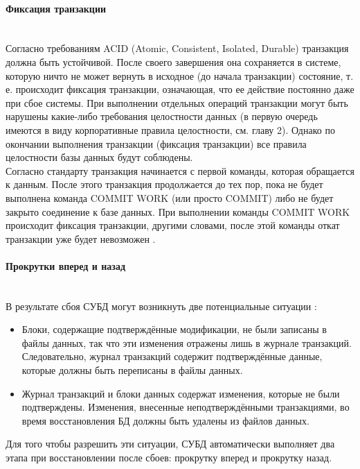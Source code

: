 \paragraph{Фиксация транзакции} ~\\

Согласно требованиям ACID (Atomic, Consistent, Isolated, Durable) транзакция должна быть устойчивой. После своего завершения она сохраняется в системе, которую ничто не может вернуть в исходное (до начала транзакции) состояние, т. е. происходит фиксация транзакции, означающая, что ее действие постоянно даже при сбое системы. При выполнении отдельных операций транзакции могут быть нарушены какие-либо требования целостности данных (в первую очередь имеются в виду корпоративные правила целостности, см. главу 2). Однако по окончании выполнения транзакции (фиксация транзакции) все правила целостности базы данных будут соблюдены. \\


Согласно стандарту транзакция начинается с первой команды, которая обращается к данным. После этого транзакция продолжается до тех пор, пока не будет выполнена команда COMMIT WORK (или просто COMMIT) либо не будет закрыто соединение к базе данных. При выполнении команды COMMIT WORK происходит фиксация транзакции, другими словами, после этой команды откат транзакции уже будет невозможен \autocite{Pirogov2009}.


\paragraph{Прокрутки вперед и назад} ~\\

В результате сбоя СУБД могут возникнуть две потенциальные ситуации \autocite{Karpova2009}:

\begin{itemize}
    \item Блоки, содержащие подтверждённые модификации, не были записаны в файлы данных, так что эти изменения отражены лишь в журнале транзакций. Следовательно, журнал транзакций содержит подтверждённые данные, которые должны быть переписаны в файлы данных.
    \item Журнал транзакций и блоки данных содержат изменения, которые не были подтверждены. Изменения, внесенные неподтверждёнными транзакциями, во время восстановления БД должны быть удалены из файлов данных.
\end{itemize}

Для того чтобы разрешить эти ситуации, СУБД автоматически выполняет два этапа при восстановлении после сбоев: прокрутку вперед и прокрутку назад.

